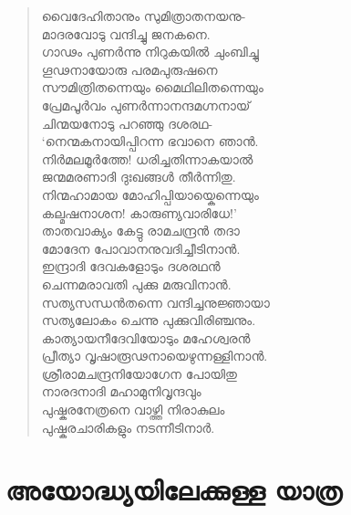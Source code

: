 \begin{verse}
വൈദേഹിതാനും സുമിത്രാതനയനു-\\
മാദരവോടു വന്ദിച്ചു ജനകനെ.\\
ഗാഢം പുണര്‍ന്നു നിറുകയില്‍ ചുംബിച്ചു\\
ഗൂഢനായോരു പരമപുരുഷനെ\\
സൗമിത്രിതന്നെയും മൈഥിലിതന്നെയും\\
പ്രേമപൂര്‍വം പുണര്‍ന്നാനന്ദമഗ്നനായ്\\
ചിന്മയനോടു പറഞ്ഞു ദശരഥ-\\
‘നെന്മകനായിപ്പിറന്ന ഭവാനെ ഞാന്‍.\\
നിര്‍മലമൂര്‍ത്തേ! ധരിച്ചതിന്നാകയാല്‍\\
ജന്മമരണാദി ദുഃഖങ്ങള്‍ തീര്‍ന്നിതു.\\
നിന്മഹാമായ മോഹിപ്പിയായ്കെന്നെയും\\
കല്മഷനാശന! കാരുണ്യവാരിധേ!’\\
താതവാക്യം കേട്ടു രാമചന്ദ്രന്‍ തദാ\\
മോദേന പോവാനനുവദിച്ചീടിനാന്‍.\\
ഇന്ദ്രാദി ദേവകളോടും ദശരഥന്‍\\
ചെന്നമരാവതി പുക്കു മരുവിനാന്‍.\\
സത്യസന്ധന്‍തന്നെ വന്ദിച്ചനുജ്ഞായാ\\
സത്യലോകം ചെന്നു പുക്കുവിരിഞ്ചനും.\\
കാത്യായനീദേവിയോടും മഹേശ്വരന്‍\\
പ്രീത്യാ വൃഷാരൂഢനായെഴുന്നള്ളിനാന്‍.\\
ശ്രീരാമചന്ദ്രനിയോഗേന പോയിതു\\
നാരദനാദി മഹാമുനിവൃന്ദവും\\
പുഷ്കരനേത്രനെ വാഴ്ത്തി നിരാകുലം\\
പുഷ്കരചാരികളും നടന്നീടിനാര്‍.
\end{verse}

\newpage

\section{അയോദ്ധ്യയിലേക്കുള്ള യാത്ര}

